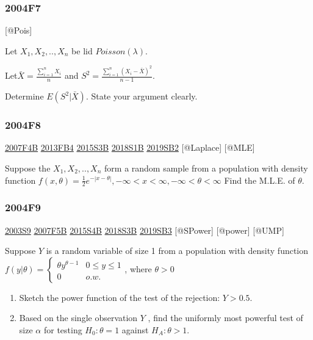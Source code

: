 \documentclass[6pt,Portrait]{article}
\begin{document}
\hypertarget{f7-2}{%
\subsubsection{2004F7}\label{f7-2}}

{[}@Pois{]}

Let \(X_1,X_2,..,X_n\) be lid \(Poisson(\lambda)\).

Let\(\bar X=\frac{\sum_{i=1}^{n}X_{i}}{n}\) and
\(S^2=\frac{\sum_{i=1}^{n}(X_{i}-\bar X)^2}{n-1}\).

Determine \(E(S^2|\bar X)\). State your argument clearly.

\hypertarget{f8-2}{%
\subsubsection{2004F8}\label{f8-2}}

\protect\hyperlink{f4b}{2007F4B} \protect\hyperlink{fb4-2}{2013FB4}
\protect\hyperlink{s3b-1}{2015S3B} \protect\hyperlink{s1b-2}{2018S1B}
\protect\hyperlink{sb2-3}{2019SB2} {[}@Laplace{]} {[}@MLE{]}

Suppose the \(X_1,X_2,..,X_n\) form a random sample from a population
with density function
\(f(x,\theta) =\frac12e^{-|x-\theta|}, -\infty<x<\infty, -\infty<\theta<\infty\)
Find the M.L.E. of \(\theta\).

\hypertarget{f9-2}{%
\subsubsection{2004F9}\label{f9-2}}

\protect\hyperlink{s9}{2003S9} \protect\hyperlink{f5b}{2007F5B}
\protect\hyperlink{s4b-1}{2015S4B} \protect\hyperlink{s3b-2}{2018S3B}
\protect\hyperlink{sb3-3}{2019SB3} {[}@SPower{]} {[}@power{]} {[}@UMP{]}

Suppose \(Y\) is a random variable of size 1 from a population with
density function
\(f(y|\theta)=\begin{cases}\theta y^{\theta-1}& 0\le y\le1\\0& o.w.\end{cases}\),
where \(\theta>0\)

\begin{enumerate}
\def\labelenumi{(\alph{enumi})}
\item
  Sketch the power function of the test of the rejection: \(Y>0.5\).
\item
  Based on the single observation \(Y\) , find the uniformly most
  powerful test of size \(\alpha\) for testing \(H_0:\theta=1\) against
  \(H_A :\theta>1\).
\end{enumerate}
\end{document}
